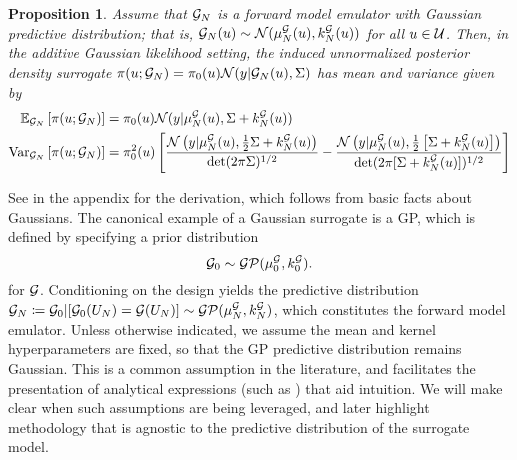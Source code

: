 \documentclass[12pt]{article}
\newtheorem{prop}{Proposition}
\begin{document}
\begin{prop} \label{prop:fwd-em-Gaussian}
Assume that $\fwdEm[\Ndesign]$ is a forward model emulator with Gaussian predictive distribution; 
that is, $\fwdEm[\Ndesign](\Par) \sim \Gaussian(\emMean[\Ndesign]{\fwd}(\Par), \emKer[\Ndesign]{\fwd}(\Par))$
for all $\Par \in \parSpace$. Then, in the additive Gaussian likelihood setting, the induced unnormalized 
posterior density surrogate 
$\postDens(\Par; \fwdEm[\Ndesign]) = \priorDens(\Par)\Gaussian(\obs| \fwdEm[\Ndesign](\Par), \likPar)$
has mean and variance given by
\begin{align*}
\E_{\fwdEm}\left[\postDens(\Par; \fwdEm[\Ndesign]) \right] 
&= \priorDens(\Par) \Gaussian(\obs | \emMean[\Ndesign]{\fwd}(\Par), \likPar + \emKer[\Ndesign]{\fwd}(\Par)) \\
\Var_{\fwdEm}\left[\postDens(\Par; \fwdEm[\Ndesign]) \right]
&= \priorDens^2(\Par) \left[\frac{\Gaussian\left(\obs | \emMean[\Ndesign]{\fwd}(\Par), \frac{1}{2}\likPar + \emKer[\Ndesign]{\fwd}(\Par)  \right)}{\det(2\pi \likPar)^{1/2}}
- \frac{\Gaussian\left(\obs | \emMean[\Ndesign]{\fwd}(\Par), \frac{1}{2}\left[\likPar + \emKer[\Ndesign]{\fwd}(\Par)\right]  \right)}{\det(2\pi [\likPar + \emKer[\Ndesign]{\fwd}(\Par)])^{1/2}}\right]
\end{align*}
\end{prop}

See  in the appendix for the derivation, which follows from basic facts about Gaussians.
The canonical example of a Gaussian surrogate is a GP, which is defined by specifying a prior distribution  
\begin{equation}
\fwdPrior \sim \GP(\emMeanPrior{\fwd}, \emKerPrior{\fwd}).
\end{equation}
for $\fwd$. Conditioning on the design yields the predictive distribution 
$\fwdEm[\Ndesign]  \Def \fwdPrior|[\fwdPrior(\designIn) = \fwd(\designIn)] \sim \GP(\emMean[\Ndesign]{\fwd}, \emKer[\Ndesign]{\fwd})$, 
which constitutes the forward model emulator.
Unless otherwise indicated, we assume the mean and kernel hyperparameters are
fixed, so that the GP predictive distribution remains Gaussian. This is a common assumption in the literature, 
and facilitates the presentation of analytical expressions (such as )
that aid intuition. We will make clear when such assumptions are being 
leveraged, and later highlight methodology that is agnostic to the predictive distribution of the surrogate model.
\end{document}
